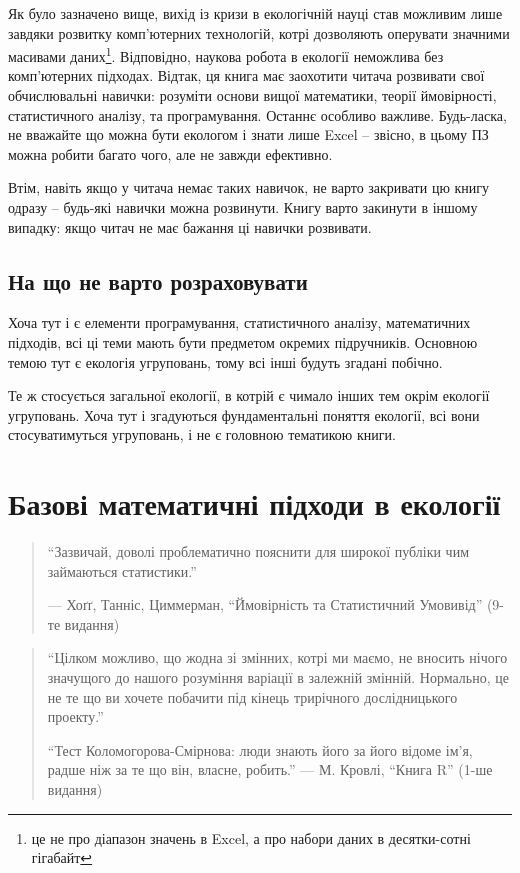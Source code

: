 \documentclass[
  11pt,
]{book}
\begin{document}
Як було зазначено вище, вихід із кризи в екологічній науці став можливим лише завдяки розвитку комп'ютерних технологій, котрі дозволяють оперувати значними масивами даних\footnote{це не про діапазон значень в Excel, а про набори даних в десятки-сотні гігабайт}. Відповідно, наукова робота в екології неможлива без комп'ютерних підходах. Відтак, ця книга має заохотити читача розвивати свої обчислювальні навички: розуміти основи вищої математики, теорії ймовірності, статистичного аналізу, та програмування. Останнє особливо важливе. Будь-ласка, не вважайте що можна бути екологом і знати лише Excel -- звісно, в цьому ПЗ можна робити багато чого, але не завжди ефективно.

Втім, навіть якщо у читача немає таких навичок, не варто закривати цю книгу одразу -- будь-які навички можна розвинути. Книгу варто закинути в іншому випадку: якщо читач не має бажання ці навички розвивати.

\section{На що не варто розраховувати}\label{notexpect}

Хоча тут і є елементи програмування, статистичного аналізу, математичних підходів, всі ці теми мають бути предметом окремих підручників. Основною темою тут є екологія угруповань, тому всі інші будуть згадані побічно.

Те ж стосується загальної екології, в котрій є чимало інших тем окрім екології угруповань. Хоча тут і згадуються фундаментальні поняття екології, всі вони стосуватимуться угруповань, і не є головною тематикою книги.

\chapter{Базові математичні підходи в екології}\label{numerical-ecology}

\begin{quote}
``Зазвичай, доволі проблематично пояснити для широкої публіки
чим займаються статистики.''

--- Хоґґ, Танніс, Циммерман, ``Ймовірність та Статистичний Умовивід'' (9-те видання)
\end{quote}

\begin{quote}
``Цілком можливо, що жодна зі змінних, котрі ми маємо,
не вносить нічого значущого до нашого розуміння
варіації в залежній змінній.
Нормально, це не те що ви хочете побачити
під кінець трирічного дослідницького проекту.''

``Тест Коломогорова-Смірнова: люди знають його за його відоме ім'я,
радше ніж за те що він, власне, робить.''
--- М. Кровлі, ``Книга R'' (1-ше видання)
\end{quote}
\end{document}
